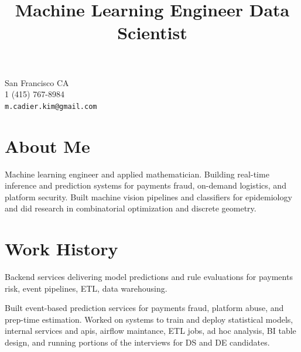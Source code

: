 \documentclass[margin,line,pifont,palatino,courier]{res}
\begin{document}


\begin{resume}




\begin{flushright}
{\small
San Francisco CA \\
1 (415) 767-8984\\
  \verb+m.cadier.kim@gmail.com+
}
\end{flushright}
 
\section{\sc  About Me}
    
      
          
      
          
            Machine learning engineer and applied mathematician.  Building real-time inference and prediction 
systems for payments fraud, on-demand logistics, and platform security.  Built machine vision pipelines 
and classifiers for epidemiology and did research in combinatorial optimization and discrete geometry.
          
      
          
      
          
      
          
      


\section{\sc  Work History}
  
  
    \title{ Machine Learning Engineer  }

    \begin{position}
    Backend services delivering model predictions and rule evaluations for payments risk, event pipelines, ETL, data warehousing.
    \end{position}
  
    \title{ Data Scientist  }

    \begin{position}
    Built event-based prediction services for payments fraud, platform abuse, and prep-time estimation.  Worked on systems to train and deploy statistical models, internal services and apis, airflow maintance, ETL jobs, ad hoc analysis, BI table design, and running portions of the interviews for DS and DE candidates.
    \end{position}
  

\end{resume}
\end{document}
